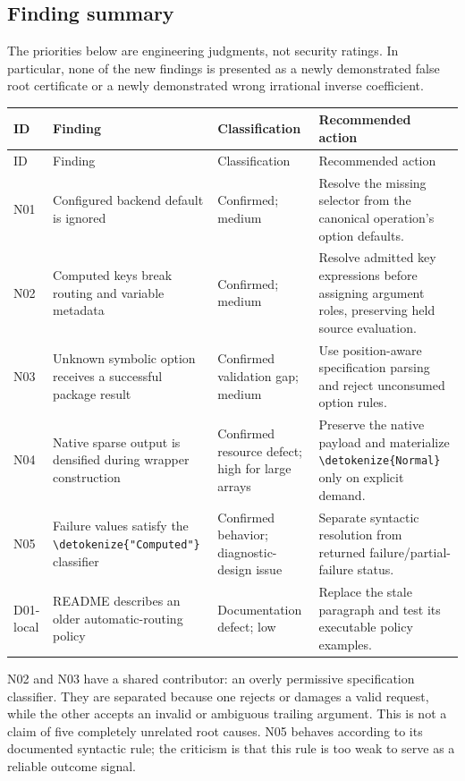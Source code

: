 \documentclass[11pt]{article}
\newcommand{\code}[1]{{\ttfamily\expandafter\nolinkurl\expandafter{\detokenize{#1}}}}
\begin{document}
\subsection{Finding summary}
The priorities below are engineering judgments, not security ratings. In particular, none of the new findings is presented as a newly demonstrated false root certificate or a newly demonstrated wrong irrational inverse coefficient.

\begin{longtable}{@{}p{}p{}p{}p{}@{}}
\toprule
ID & Finding & Classification & Recommended action \\
\midrule\endfirsthead
\toprule ID & Finding & Classification & Recommended action \\
\midrule\endhead
N01 & Configured backend default is ignored & Confirmed; medium & Resolve the missing selector from the canonical operation's option defaults. \\
N02 & Computed keys break routing and variable metadata & Confirmed; medium & Resolve admitted key expressions before assigning argument roles, preserving held source evaluation. \\
N03 & Unknown symbolic option receives a successful package result & Confirmed validation gap; medium & Use position-aware specification parsing and reject unconsumed option rules. \\
N04 & Native sparse output is densified during wrapper construction & Confirmed resource defect; high for large arrays & Preserve the native payload and materialize \code{Normal} only on explicit demand. \\
N05 & Failure values satisfy the \code{"Computed"} classifier & Confirmed behavior; diagnostic-design issue & Separate syntactic resolution from returned failure/partial-failure status. \\
D01-local & README describes an older automatic-routing policy & Documentation defect; low & Replace the stale paragraph and test its executable policy examples. \\
\bottomrule
\end{longtable}

N02 and N03 have a shared contributor: an overly permissive specification classifier. They are separated because one rejects or damages a valid request, while the other accepts an invalid or ambiguous trailing argument. This is not a claim of five completely unrelated root causes. N05 behaves according to its documented syntactic rule; the criticism is that this rule is too weak to serve as a reliable outcome signal.
\end{document}
